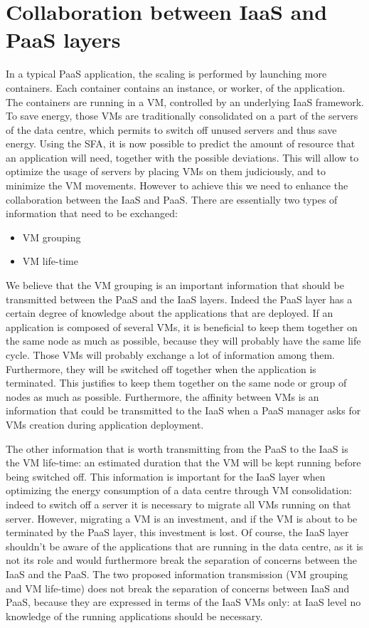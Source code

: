 
\section{Collaboration between IaaS and PaaS layers}
\label{sec:iaaspaas}

In a typical PaaS application, the scaling is performed by launching more containers.
Each container contains an instance, or worker, of the application.
The containers are running in a VM, controlled by an underlying IaaS framework.
To save energy, those VMs are traditionally consolidated on a part of the servers of the data centre, which permits to switch off unused servers and thus save energy.
Using the SFA, it is now possible to predict the amount of resource that an application will need, together with the possible deviations.
This will allow to optimize the usage of servers by placing VMs on them judiciously, and to minimize the VM movements.
However to achieve this we need to enhance the collaboration between the IaaS and PaaS.
There are essentially two types of information that need to be exchanged:
\begin{itemize}
  \item VM grouping
  \item VM life-time
\end{itemize}

We believe that the VM grouping is an important information that should be transmitted between the PaaS and the IaaS layers.
Indeed the PaaS layer has a certain degree of knowledge about the applications that are deployed.
If an application is composed of several VMs, it is beneficial to keep them together on the same node as much as possible, because they will probably have the same life cycle.
Those VMs will probably exchange a lot of information among them.
Furthermore, they will be switched off together when the application is terminated.
This justifies to keep them together on the same node or group of nodes as much as possible.
Furthermore, the affinity between VMs is an information that could be transmitted to the IaaS when a PaaS manager asks for VMs creation during application deployment.

The other information that is worth transmitting from the PaaS to the IaaS is the VM life-time: an estimated duration that the VM will be kept running before being switched off.
This information is important for the IaaS layer when optimizing the energy consumption of a data centre through VM consolidation: indeed to switch off a server it is necessary to migrate all VMs running on that server.
However, migrating a VM is an investment, and if the VM is about to be terminated by the PaaS layer, this investment is lost.
Of course, the IaaS layer shouldn't be aware of the applications that are running in the data centre, as it is not its role and would furthermore break the separation of concerns between the IaaS and the PaaS.
The two proposed information transmission (VM grouping and VM life-time) does not break the separation of concerns between IaaS and PaaS, because they are expressed in terms of the IaaS VMs only: at IaaS level no knowledge of the running applications should be necessary.


